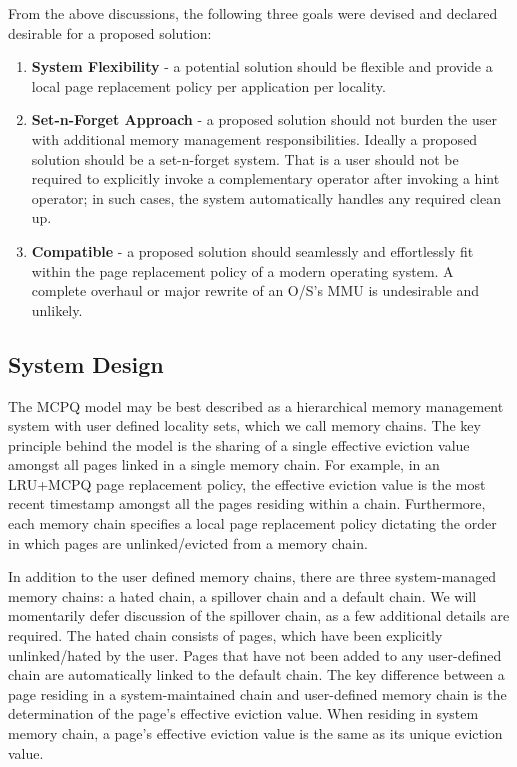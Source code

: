 \documentclass[10pt,a4paper,twocolumn]{article}
\begin{document}
From the above discussions, the following three goals were devised and declared desirable for a proposed solution:

\begin{enumerate}
  \item \textbf{System Flexibility} - a potential solution should be flexible and provide a local page replacement policy per application per locality.
  \item \textbf{Set-n-Forget Approach} - a proposed solution should not burden the user with additional memory management responsibilities.  Ideally a proposed solution should be a set-n-forget system. That is a user should not be required to explicitly invoke a complementary operator after invoking a hint operator; in such cases, the system automatically handles any required clean up.
  \item \textbf{Compatible} - a proposed solution should seamlessly and effortlessly fit within the page replacement policy of a modern operating system. A complete overhaul or major rewrite of an O/S's MMU is undesirable and unlikely.
\end{enumerate}

\subsection{System Design}
The MCPQ model may be best described as a hierarchical memory management system with user defined
locality sets, which we call memory chains. The key principle behind the model is the sharing of a
single effective eviction value amongst all pages linked in a single memory chain.  For example, in
an LRU+MCPQ page replacement policy, the effective eviction value is the most recent timestamp
amongst all the pages residing within a chain. Furthermore, each memory chain specifies a local page
replacement policy dictating the order in which pages are unlinked/evicted from a memory chain.  
 
In addition to the user defined memory chains, there are three system-managed memory chains: a hated
chain, a spillover chain and a default chain. We will momentarily defer discussion of the spillover
chain, as a few additional details are required. The hated chain consists of pages, which have been
explicitly unlinked/hated by the user. Pages that have not been added to any user-defined chain are
automatically linked to the default chain. The key difference between a page residing in a
system-maintained chain and user-defined memory chain is the determination of the page's effective
eviction value.  When residing in system memory chain, a page's effective eviction value is the same
as its unique eviction value.
 
\end{document}
